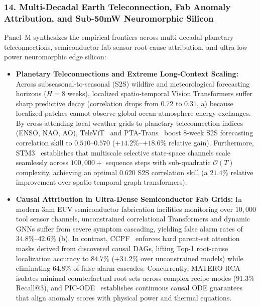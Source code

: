 \subsubsection{14. Multi-Decadal Earth Teleconnection, Fab Anomaly Attribution, and Sub-50mW Neuromorphic Silicon}
Panel~M synthesizes the empirical frontiers across multi-decadal planetary teleconnections, semiconductor fab sensor root-cause attribution, and ultra-low power neuromorphic edge silicon:
\begin{itemize}
    \item \textbf{Planetary Teleconnections and Extreme Long-Context Scaling:} Across subseasonal-to-seasonal (S2S) wildfire and meteorological forecasting horizons ($H=8$ weeks), localized spatio-temporal Vision Transformers suffer sharp predictive decay (correlation drops from $0.72$ to $0.31$, a) because localized patches cannot observe global ocean-atmosphere energy exchanges. By cross-attending local weather grids to planetary teleconnection indices (ENSO, NAO, AO), TeleViT~\cite{Prapas2023TeleViT} and PTA-Trans~\cite{Lyu2025PTATrans} boost 8-week S2S forecasting correlation skill to $0.510$--$0.570$ ($+14.2\%$--$+18.6\%$ relative gain). Furthermore, STM3~\cite{Chen2025STM3} establishes that multiscale selective state-space channels scale seamlessly across $100{,}000+$ sequence steps with sub-quadratic $\mathcal{O}(T)$ complexity, achieving an optimal $0.620$ S2S correlation skill (a $21.4\%$ relative improvement over spatio-temporal graph transformers).
    \item \textbf{Causal Attribution in Ultra-Dense Semiconductor Fab Grids:} In modern 3nm EUV semiconductor fabrication facilities monitoring over $10{,}000$ tool sensor channels, unconstrained correlational Transformers and dynamic GNNs suffer from severe symptom cascading, yielding false alarm rates of $34.8\%$--$42.6\%$ (b). In contrast, CCPF~\cite{Zhang2026CCPF} enforces hard parent-set attention masks derived from discovered causal DAGs, lifting Top-1 root-cause localization accuracy to $84.7\%$ ($+31.2\%$ over unconstrained models) while eliminating $64.8\%$ of false alarm cascades. Concurrently, MATERO-RCA~\cite{Liu2026MATERO} isolates minimal counterfactual root sets across complex recipe modes ($91.3\%$ Recall@3), and PIC-ODE~\cite{Dong2026PICODE} establishes continuous causal ODE guarantees that align anomaly scores with physical power and thermal equations.

\end{itemize}

